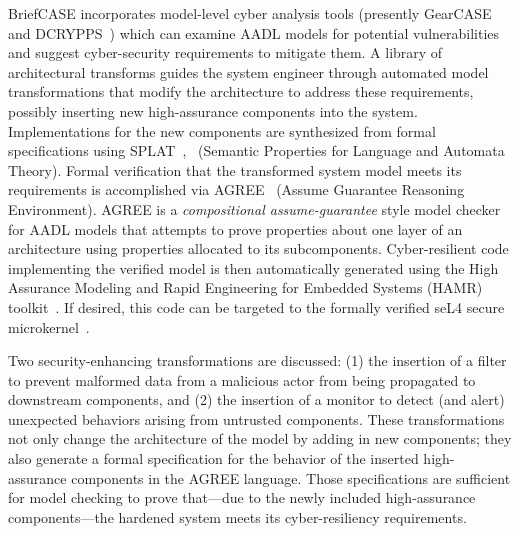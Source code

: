 BriefCASE incorporates model-level cyber analysis tools (presently
GearCASE~\cite{gearcase2020} and DCRYPPS~\cite{dcrypps2019}) which can
examine AADL models for potential vulnerabilities and suggest
cyber-security requirements to mitigate them.  A library of
architectural transforms guides the system engineer through automated
model transformations that modify the architecture to address these
requirements, possibly inserting new high-assurance components into
the system.  Implementations for the new components are synthesized
from formal specifications using
SPLAT~\cite{slind-hcss2020},~\cite{formal-filter-synth-langsec}
(Semantic Properties for Language and Automata Theory).  Formal
verification that the transformed system model meets its requirements
is accomplished via AGREE~\cite{agree2013} (Assume Guarantee Reasoning
Environment).
AGREE is a {\em compositional assume-guarantee} style model checker
for AADL models that attempts to prove properties about one layer of
an architecture using properties allocated to its subcomponents.
Cyber-resilient code implementing the verified model is then
automatically generated using the High Assurance Modeling and Rapid
Engineering for Embedded Systems (HAMR) toolkit~\cite{hamr}.  If
desired, this code can be targeted to the formally verified seL4
secure microkernel~\cite{sel4-2009}.


Two security-enhancing transformations are discussed: (1) the
insertion of a filter to prevent malformed data from a malicious actor
from being propagated to downstream components, and (2) the insertion
of a monitor to detect (and alert) unexpected behaviors arising from
untrusted components. These transformations not only change the
architecture of the model by adding in new components; they also
generate a formal specification for the behavior of the inserted
high-assurance components in the AGREE language. Those specifications
are sufficient for model checking to prove that---due to the newly
included high-assurance components---the hardened system meets its
cyber-resiliency requirements.

